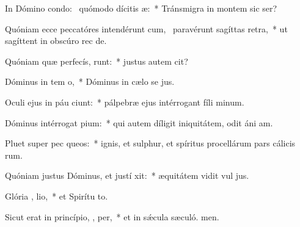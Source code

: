 \item In Dómino condo:~\pscross{} quómodo dícitis  æ:~* Tránsmigra in montem sic ser?
\item Quóniam ecce peccatóres intendérunt cum,~\pscross{} paravérunt sagíttas   retra,~* ut sagíttent in obscúro rec de.
\item Quóniam quæ perfecís, runt:~* justus autem  cit?
\item Dóminus in tem  o,~* Dóminus in cælo se jus.
\item Oculi ejus in páu ciunt:~* pálpebræ ejus intérrogant fíli minum.
\item Dóminus intérrogat   pium:~* qui autem díligit iniquitátem, odit áni am.
\item Pluet super pec queos:~* ignis, et sulphur, et spíritus procellárum pars cálicis rum.
\item Quóniam justus Dóminus, et justí xit:~* æquitátem vidit vul jus.
\item Glória ,  lio,~* et Spirítu to.
\item Sicut erat in princípio,  ,  per,~* et in sǽcula sæculó. men.

